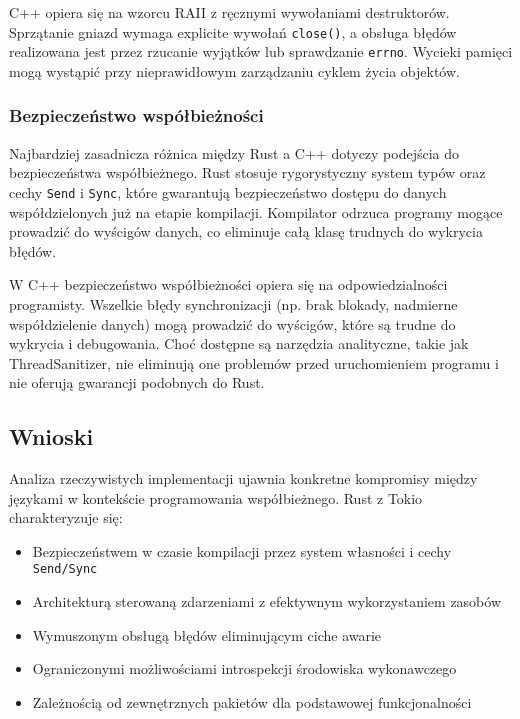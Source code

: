 C++ opiera się na wzorcu RAII z ręcznymi wywołaniami destruktorów. Sprzątanie gniazd wymaga explicite wywołań \texttt{close()}, a obsługa błędów realizowana jest przez rzucanie wyjątków lub sprawdzanie \texttt{errno}. Wycieki pamięci mogą wystąpić przy nieprawidłowym zarządzaniu cyklem życia objektów.


\subsubsection{Bezpieczeństwo współbieżności}

Najbardziej zasadnicza różnica między Rust a C++ dotyczy podejścia do bezpieczeństwa współbieżnego. Rust stosuje rygorystyczny system typów oraz cechy \texttt{Send} i \texttt{Sync}, które gwarantują bezpieczeństwo dostępu do danych współdzielonych już na etapie kompilacji. Kompilator odrzuca programy mogące prowadzić do wyścigów danych, co eliminuje całą klasę trudnych do wykrycia błędów.

W C++ bezpieczeństwo współbieżności opiera się na odpowiedzialności programisty. Wszelkie błędy synchronizacji (np. brak blokady, nadmierne współdzielenie danych) mogą prowadzić do wyścigów, które są trudne do wykrycia i debugowania. Choć dostępne są narzędzia analityczne, takie jak ThreadSanitizer, nie eliminują one problemów przed uruchomieniem programu i nie oferują gwarancji podobnych do Rust.



\subsection{Wnioski}

Analiza rzeczywistych implementacji ujawnia konkretne kompromisy między językami w kontekście programowania współbieżnego.
Rust z Tokio charakteryzuje się:
\begin{itemize}
    \item Bezpieczeństwem w czasie kompilacji przez system własności i cechy \texttt{Send/Sync}
    \item Architekturą sterowaną zdarzeniami z efektywnym wykorzystaniem zasobów
    \item Wymuszonym obsługą błędów eliminującym ciche awarie 
    \item Ograniczonymi możliwościami introspekcji środowiska wykonawczego
    \item Zależnością od zewnętrznych pakietów  dla podstawowej funkcjonalności
\end{itemize}

